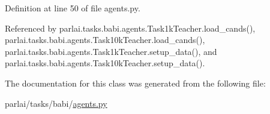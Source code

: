 Definition at line 50 of file agents.\+py.



Referenced by parlai.\+tasks.\+babi.\+agents.\+Task1k\+Teacher.\+load\+\_\+cands(), parlai.\+tasks.\+babi.\+agents.\+Task10k\+Teacher.\+load\+\_\+cands(), parlai.\+tasks.\+babi.\+agents.\+Task1k\+Teacher.\+setup\+\_\+data(), and parlai.\+tasks.\+babi.\+agents.\+Task10k\+Teacher.\+setup\+\_\+data().



The documentation for this class was generated from the following file\+:\begin{DoxyCompactItemize}
\item 
parlai/tasks/babi/\hyperlink{parlai_2tasks_2babi_2agents_8py}{agents.\+py}\end{DoxyCompactItemize}
